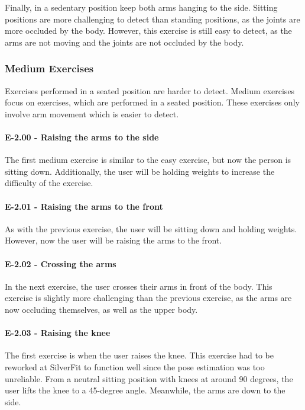 Finally, in a sedentary position keep both arms hanging to the side. Sitting positions are more challenging to detect than standing positions, as the joints are more occluded by the body. However, this exercise is still easy to detect, as the arms are not moving and the joints are not occluded by the body.

\subsubsection{Medium Exercises}

Exercises performed in a seated position are harder to detect. Medium exercises focus on exercises, which are performed in a seated position. These exercises only involve arm movement which is easier to detect.

\paragraph{E-2.00 - Raising the arms to the side}

The first medium exercise is similar to the easy exercise, but now the person is sitting down. Additionally, the user will be holding weights to increase the difficulty of the exercise.

\paragraph{E-2.01 - Raising the arms to the front}

As with the previous exercise, the user will be sitting down and holding weights. However, now the user will be raising the arms to the front. 

\paragraph{E-2.02 - Crossing the arms}

 In the next exercise, the user crosses their arms in front of the body. This exercise is slightly more challenging than the previous exercise, as the arms are now occluding themselves, as well as the upper body.

 \paragraph{E-2.03 - Raising the knee}

 The first exercise is when the user raises the knee. This exercise had to be reworked at SilverFit to function well since the pose estimation was too unreliable. From a neutral sitting position with knees at around 90 degrees, the user lifts the knee to a 45-degree angle. Meanwhile, the arms are down to the side.

